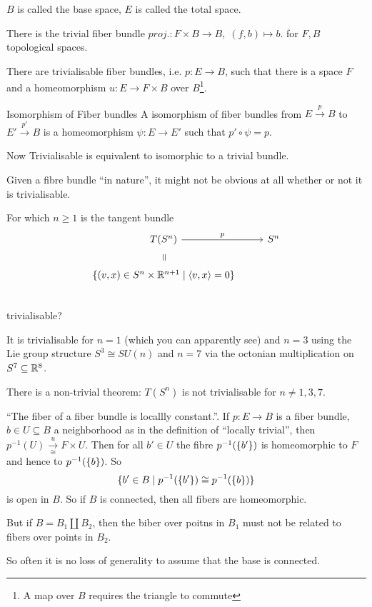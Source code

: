\documentclass[language=english]{TemplateLecture}
\begin{document}
\begin{notation}
    \(B\) is called the base space, \(E\) is called the total space.
\end{notation}

\begin{example}
    There is the trivial fiber bundle \(proj.\colon F\times B \to B, \; (f,b) \mapsto b\). for \(F,B\) topological spaces.

    There are trivialisable fiber bundles, i.e. \(p\colon E \to B\), such that there is a space \(F\) and a homeomorphism \(u \colon E \to F\times B\) over \(B\)\footnote{A map over \(B\) requires the triangle to commute}.
\end{example}

\begin{defi}{Isomorphism of Fiber bundles}{}
    A isomorphism of fiber bundles from \(E \xrightarrow{p} B\) to \(E' \xrightarrow{p'} B\) is a homeomorphism \(\psi \colon E \to E'\) such that \(p' \circ \psi = p\).
\end{defi}

Now Trivialisable is equivalent to isomorphic to a trivial bundle.

Given a fibre bundle \enquote{in nature}, it might not be obvious at all whether or not it is trivialisable.

\begin{Example}
    For which \(n \geq 1\) is the tangent bundle
    \[\begin{tikzcd}
        T(S^n) \ar[d, "=", phantom, sloped] \ar[r, "p"] & S^n \\
        \set{(v,x) \in S^n \times \IR^{n+1} \mid \skal{v,x} = 0} & \\
    \end{tikzcd}\]
    trivialisable?

    It is trivialisable for \(n =1\) (which you can apparently see) and \(n = 3\) using the Lie group structure \(S^3 \cong SU(n)\) and \(n = 7\) via the octonian multiplication on \(S^7 \subseteq \mathbb{R}^8\).

    There is a non-trivial theorem: \(T(S^n)\) is not trivialisable for \(n \neq 1,3,7\).
\end{Example}

\begin{remark}
    \enquote{The fiber  of a fiber bundle is locallly constant.}. If \(p\colon E \to B\) is a fiber bundle, \(b \in U \subseteq B\) a neighborhood as in the definition of \enquote{locally trivial}, then \(p^{-1}(U) \xrightarrow[\cong]{u} F \times U\). Then for all \(b' \in U\) the fibre \(p^{-1}(\{b'\})\) is homeomorphic to \(F\) and hence to \(p^{-1}(\{b\})\). So
    \[\{b' \in B \mid p^{-1}(\{b'\}) \cong p^{-1}(\{b\})\}\]
    is open in \(B\). So if \(B\) is connected, then all fibers are homeomorphic.

    But if \(B = B_1 \amalg B_2\), then the biber over poitns in \(B_1\) must not be related to fibers over points in \(B_2\).

    So often it is no loss of generality to assume that the base is connected.
\end{remark}
\end{document}
